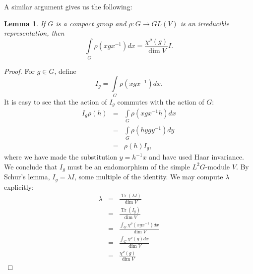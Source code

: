 \documentclass[12pt]{article}
\newtheorem{lem}[thm]{Lemma}
\newcommand{\be}{\begin{equation}}
\newcommand{\ee}{\end{equation}}
\newcommand{\bea}{\begin{eqnarray}}
\newcommand{\eea}{\end{eqnarray}}
\newcommand{\nn}{\nonumber}
\DeclareMathOperator{\Tr}{Tr}
\begin{document}
A similar argument gives us the following:
\begin{lem}\label{wordindicator}
If $G$ is a compact group and $\rho : G \to GL(V)$ is an irreducible representation, then
\be 
\int \limits_G \rho(x g x^{-1}) dx = \frac{\chi^{\rho}(g)}{\dim{V}} I.
\ee
\end{lem}
\begin{proof}
For $g \in G$, define 
\be 
I_g = \int \limits_G \rho(x g x^{-1}) dx.
\ee
It is easy to see that the action of $I_g$ commutes with the action of $G$:
\bea I_g \rho(h) & = & \int \limits_G \rho(x g x^{-1} h) dx \nn\\
 & = &  \int \limits_G \rho(h y g y^{-1}) dy \nn\\
 & = & \rho(h) I_g,
\eea
where we have made the substitution $y = h^{-1} x$ and have used Haar invariance.  We conclude that $I_g$ must be an endomorphism of the simple $L^2 G$-module $V$.  By Schur's lemma, $I_g=\lambda I$, some multiple of the identity.  We may compute $\lambda$ explicitly:
\bea \lambda & = & \frac{\Tr (\lambda I)}{\dim{V}} \nn\\
 & = & \frac{\Tr(I_g)}{\dim{V}} \nn\\
 & = & \frac{\int_G \chi^{\rho}(x g x^{-1}) dx}{\dim{V}} \nn\\
 & = & \frac{\int_G \chi^{\rho}(g) dx}{\dim{V}} \nn\\
 & = & \frac{ \chi^{\rho}(g)}{\dim{V}} 
\eea
\end{proof}
\end{document}
